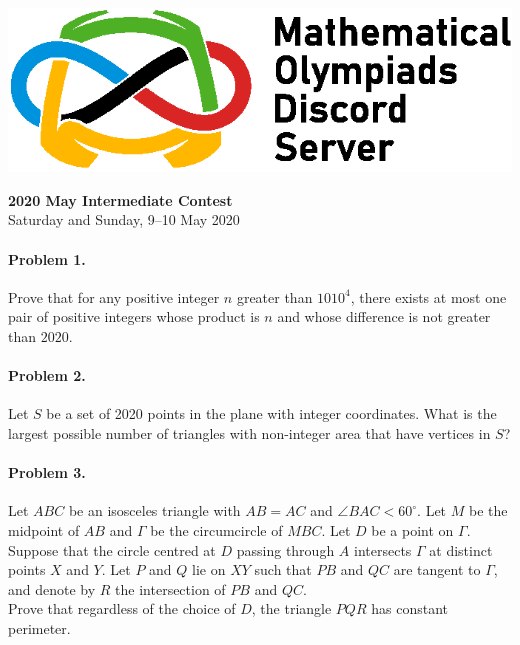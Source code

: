 \documentclass[12pt]{article}
\newcommand*{\currpos}[1]{%
  \zsavepos{#1}%
}
\begin{document}
		\begin{flushleft}
		\includegraphics[scale=0.7]{MODS_text_right.eps}\\
		\end{flushleft}
		\vspace{15pt}
		\noindent \LARGE\textbf{2020 May Intermediate Contest}\\[10pt]
		\noindent \normalsize{Saturday and Sunday, 9--10 May 2020}\\
		\noindent \makebox[\linewidth]{\rule{\textwidth}{0.4pt}}
			
	\normalsize
	
	\paragraph{\currpos{one}Problem 1.} Prove that for any positive integer \(n\) greater than \(1010^4\), there exists at most one pair of positive integers whose product is \(n\) and whose difference is not greater than \(2020\).
	
	\paragraph{\currpos{two}Problem 2.} Let \(S\) be a set of 2020 points in the plane with integer coordinates. What is the largest possible number of triangles with non-integer area that have vertices in \(S\)?
	
	\paragraph{\currpos{three}Problem 3.} Let $ABC$ be an isosceles triangle with $AB = AC$ and $\angle BAC < 60^{\circ}$. Let $M$ be the midpoint of $AB$ and $\Gamma$ be the circumcircle of $MBC$. Let $D$ be a point on $\Gamma$. Suppose that the circle centred at $D$ passing through $A$ intersects $\Gamma$ at distinct points $X$ and $Y$. Let \(P\) and \(Q\) lie on \(XY\) such that \(PB\) and \(QC\) are tangent to \(\Gamma\), and denote by \(R\) the intersection of \(PB\) and \(QC\).\\[7pt]
Prove that regardless of the choice of \(D\), the triangle \(PQR\) has constant perimeter.
	
\end{document}
